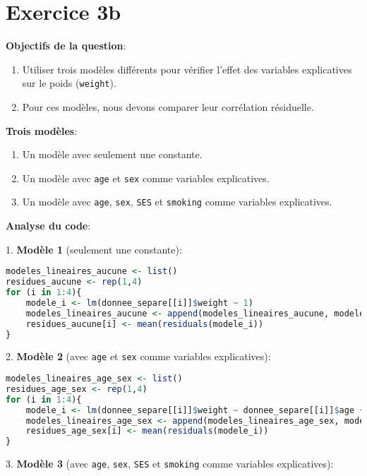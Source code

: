 \documentclass[12pt,a4paper]{article}
\begin{document}
\section{Exercice 3b}

\textbf{Objectifs de la question}:
\begin{enumerate}
    \item Utiliser trois modèles différents pour vérifier l'effet des variables explicatives sur le poids (\texttt{weight}).
    \item Pour ces modèles, nous devons comparer leur corrélation résiduelle.
\end{enumerate}

\textbf{Trois modèles}:
\begin{enumerate}
    \item Un modèle avec seulement une constante.
    \item Un modèle avec \texttt{age} et \texttt{sex} comme variables explicatives.
    \item Un modèle avec \texttt{age}, \texttt{sex}, \texttt{SES} et \texttt{smoking} comme variables explicatives.
\end{enumerate}

\textbf{Analyse du code}:

1. \textbf{Modèle 1} (seulement une constante):

   \begin {lstlisting}[language=R]
  modeles_lineaires_aucune <- list()
residues_aucune <- rep(1,4)
for (i in 1:4){
    modele_i <- lm(donnee_separe[[i]]$weight ~ 1)
    modeles_lineaires_aucune <- append(modeles_lineaires_aucune, modele_i)
    residues_aucune[i] <- mean(residuals(modele_i))
}
  \end{lstlisting}

2. \textbf{Modèle 2} (avec \texttt{age} et \texttt{sex} comme variables explicatives):

   \begin {lstlisting}[language=R]
   modeles_lineaires_age_sex <- list()
residues_age_sex <- rep(1,4)
for (i in 1:4){
    modele_i <- lm(donnee_separe[[i]]$weight ~ donnee_separe[[i]]$age + donnee_separe[[i]]$sex)
    modeles_lineaires_age_sex <- append(modeles_lineaires_age_sex, modele_i)
    residues_age_sex[i] <- mean(residuals(modele_i))
}

   \end{lstlisting}

3. \textbf{Modèle 3} (avec \texttt{age}, \texttt{sex}, \texttt{SES} et \texttt{smoking} comme variables explicatives):
\end{document}
